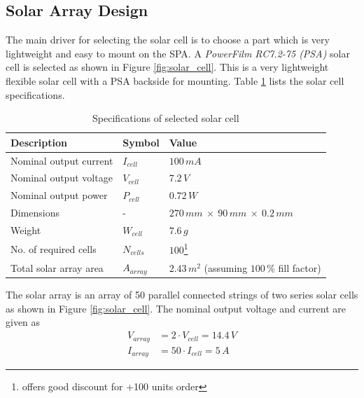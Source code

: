 \subsection{Solar Array Design}
\label{sec:SA}
The main driver for selecting the solar cell is to choose a part which is very lightweight and easy to mount on the \ac{SPA}. A  \textit{PowerFilm RC7.2-75 (PSA)} solar cell is selected as shown in Figure \ref{fig:solar_cell}. This is a very lightweight flexible solar cell with a \ac{PSA} backside for mounting. Table \ref{tab:solar_cell_spec} lists the solar cell specifications.
%
\begin{table}[H]
\centering
\caption{Specifications of selected solar cell}
\label{tab:solar_cell_spec}
\begin{minipage}{\textwidth}
\begin{tabular}{p{}p{}p{}}
\hline
\textbf{Description} & \textbf{Symbol} & \textbf{Value}\\
\hline
Nominal output current & $I_{cell}$ & $100\,mA$\\
Nominal output voltage & $V_{cell}$ & $7.2\,V$\\
Nominal output power & $P_{cell}$ & $0.72\,W$\\
Dimensions & - & $270\,mm\:\times\:90\,mm\:\times\:0.2\,mm$\\
Weight & $W_{cell}$ & $7.6\,g$\\
No. of required cells & $N_{cells}$ & $100$\footnote{\cite{avnetexpress} offers good discount for +100 units order}\\
Total solar array area & $A_{array}$ & $2.43\,m^2$ (assuming $100\,\%$ fill factor)\\
\hline
\end{tabular}\par
\vspace{-0.75\skip\footins}
\renewcommand{\footnoterule}{}
\end{minipage}
\end{table}
%
\noindent
The solar array is an array of 50 parallel connected strings of two series solar cells as shown in Figure \ref{fig:solar_cell}. The nominal output voltage and current are given as
%
\begin{equation}
\begin{split}
V_{array}&=2\cdot V_{cell}=14.4\,V\\
I_{array}&=50\cdot I_{cell}=5\,A
\end{split}
\end{equation}
%
